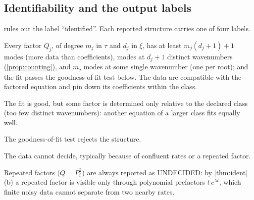 \documentclass[11pt]{article}
\theoremstyle{plain}
\theoremstyle{definition}
\theoremstyle{remark}
\newcommand{\lab}[1]{\textsf{#1}}           %
\newcommand{\FC}{\lab{FIT-COMPATIBLE}}
\newcommand{\IDK}{\lab{ID-KER}}
\newcommand{\MIS}{\lab{MISFIT}}
\newcommand{\UND}{\lab{UNDECIDED}}
\begin{document}
\subsection{Identifiability and the output labels}\label{sec:alg-labels}
 rules out the label ``identified''. Each reported structure carries one of four labels.
\begin{description}[leftmargin=2.9cm,labelwidth=2.7cm]
  \item[\FC] Every factor $Q_j$, of degree $m_j$ in $\tau$ and $d_j$ in $\xi$, has at least $m_j(d_j+1)+1$ modes
  (more data than coefficients), modes at $d_j+1$ distinct wavenumbers (\cref{prop:counting}), and $m_j$ modes
  at some single wavenumber (one per root); and the fit passes the goodness-of-fit test below.
  The data are compatible with the factored equation and pin down its coefficients within the class.
  \item[\IDK] The fit is good, but some factor is determined only relative to the declared class (too
  few distinct wavenumbers): another equation of a larger class fits equally well.
  \item[\MIS] The goodness-of-fit test rejects the structure.
  \item[\UND] The data cannot decide, typically because of confluent rates or a repeated factor.
\end{description}
Repeated factors ($Q=P_i^2$) are always reported as \UND: by \cref{thm:ident}(b) a repeated factor is
visible only through polynomial prefactors $t\,e^{\lambda t}$, which finite noisy data cannot separate from
two nearby rates.
\end{document}
